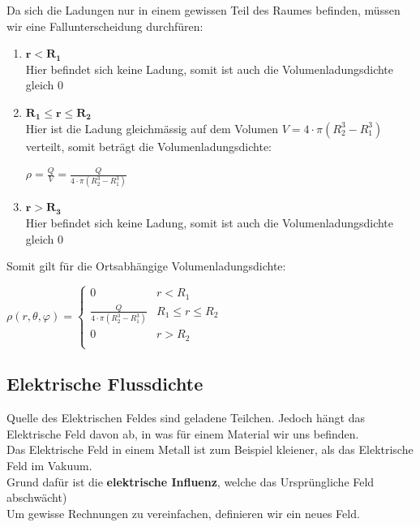 \beginbsp
Da sich die Ladungen nur in einem gewissen Teil des Raumes befinden, müssen wir eine Fallunterscheidung durchfüren:
\begin{enumerate}
	\item $\mathbf{r < R_1}$ \\
	Hier befindet sich keine Ladung, somit ist auch die Volumenladungsdichte gleich 0
		\item $\mathbf{R_1 \leq r \leq R_2}$ \\
		Hier ist die Ladung gleichmässig auf dem Volumen $V = 4\cdot \pi (R_2^3 - R_1^3)$ verteilt, somit beträgt die Volumenladungsdichte:
		\begin{center}
			$\rho = \frac{Q}{V} = \frac{Q}{4 \cdot \pi (R_2^3 - R_1^3) }$
		\end{center}
		\item $\mathbf{r > R_3}$ \\
		Hier befindet sich keine Ladung, somit ist auch die Volumenladungsdichte gleich 0
\end{enumerate}

Somit gilt für die Ortsabhängige Volumenladungsdichte:
\begin{center}
	$	\rho(r,\theta,\varphi) =
		\begin{cases}
			0                                       & r < R_1 \\
		 \frac{Q}{4 \cdot \pi (R_2^3 - R_1^3)} & R_1 \leq r \leq R_2\\
				0                                       & r > R_2 \\
		\end{cases}$
\end{center}

\iend



\subsection{Elektrische Flussdichte}
Quelle des Elektrischen Feldes sind geladene Teilchen. Jedoch hängt das Elektrische Feld davon ab, in was für einem Material wir uns befinden. \\
Das Elektrische Feld in einem Metall ist zum Beispiel kleiener, als das Elektrische Feld im Vakuum. \\
Grund dafür ist die \textbf{elektrische Influenz}, welche das Ursprüngliche Feld abschwächt) \\
Um gewisse Rechnungen zu vereinfachen, definieren wir ein neues Feld.


